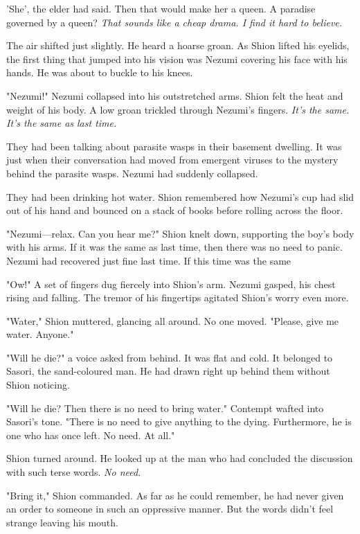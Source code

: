 'She', the elder had said. Then that would make her a queen. A paradise
governed by a queen? \emph{That sounds like a cheap drama. I find it hard to
believe.}

The air shifted just slightly. He heard a hoarse groan. As Shion lifted
his eyelids, the first thing that jumped into his vision was Nezumi
covering his face with his hands. He was about to buckle to his knees.

\mybreak

"Nezumi!" Nezumi collapsed into his outstretched arms. Shion felt the
heat and weight of his body. A low groan trickled through Nezumi's
fingers. \emph{It's the same. It's the same as last time.}

They had been talking about parasite wasps in their basement dwelling.
It was just when their conversation had moved from emergent viruses to
the mystery behind the parasite wasps. Nezumi had suddenly collapsed.

They had been drinking hot water. Shion remembered how Nezumi's cup had
slid out of his hand and bounced on a stack of books before rolling
across the floor.

"Nezumi---relax. Can you hear me?" Shion knelt down, supporting the boy's
body with his arms. If it was the same as last time, then there was no
need to panic. Nezumi had recovered just fine last time. If this time
was the same\el 

"Ow!" A set of fingers dug fiercely into Shion's arm. Nezumi gasped, his
chest rising and falling. The tremor of his fingertips agitated Shion's
worry even more.

"Water," Shion muttered, glancing all around. No one moved. "Please,
give me water. Anyone."

"Will he die?" a voice asked from behind. It was flat and cold. It
belonged to Sasori, the sand-coloured man. He had drawn right up behind
them without Shion noticing.

"Will he die? Then there is no need to bring water." Contempt wafted
into Sasori's tone. "There is no need to give anything to the dying.
Furthermore, he is one who has once left. No need. At all."

Shion turned around. He looked up at the man who had concluded the
discussion with such terse words. \emph{No need.}

"Bring it," Shion commanded. As far as he could remember, he had never
given an order to someone in such an oppressive manner. But the words
didn't feel strange leaving his mouth.

